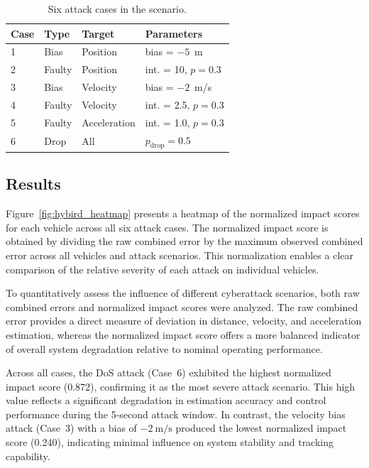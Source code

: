 \documentclass{ifacconf}
\begin{document}
\begin{table}[h!]
\centering
\caption{Six attack cases in the scenario.}
\label{tab:attack_mix}
\begin{tabular}{llll}
\toprule
\textbf{Case} & \textbf{Type} & \textbf{Target} & \textbf{Parameters} \\
\midrule
1 & Bias & Position & bias = $-5$~m \\
2 & Faulty & Position & int. = 10, $p = 0.3$ \\
3 & Bias & Velocity & bias = $-2$~m/s \\
4 & Faulty & Velocity & int. = 2.5, $p = 0.3$ \\
5 & Faulty & Acceleration & int. = 1.0, $p = 0.3$ \\
6 & Drop & All & $p_\text{drop} = 0.5$ \\
\bottomrule
\end{tabular}
\end{table}

\vspace*{-0.2cm}
\subsection {Results}
\vspace*{-0.2cm}

Figure~\ref{fig:hybird_heatmap} presents a heatmap of the normalized impact scores for each vehicle across all six attack cases. The normalized impact score is obtained by dividing the raw combined error by the maximum observed combined error across all vehicles and attack scenarios. This normalization enables a clear comparison of the relative severity of each attack on individual vehicles.

To quantitatively assess the influence of different cyberattack scenarios, both raw combined errors and normalized impact scores were analyzed. The raw combined error provides a direct measure of deviation in distance, velocity, and acceleration estimation, whereas the normalized impact score offers a more balanced indicator of overall system degradation relative to nominal operating performance.

Across all cases, the DoS attack (Case~6) exhibited the highest normalized impact score (0.872), confirming it as the most severe attack scenario. This high value reflects a significant degradation in estimation accuracy and control performance during the 5-second attack window. In contrast, the velocity bias attack (Case~3) with a bias of $-2~\text{m/s}$ produced the lowest normalized impact score (0.240), indicating minimal influence on system stability and tracking capability.
\end{document}
